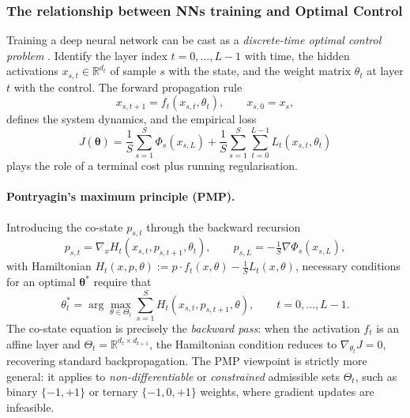\documentclass{article}
\begin{document}
\subsubsection{The relationship between NNs training and Optimal Control}

Training a deep neural network can be cast as a \emph{discrete-time optimal
control problem} \cite{li2018oc}.  Identify the layer index $t=0,\ldots,L-1$
with time, the hidden activations $x_{s,t}\in\mathbb{R}^{d_t}$ of sample $s$
with the state, and the weight matrix $\theta_t$ at layer $t$ with the control.
The forward propagation rule
\begin{equation}
    x_{s,t+1} = f_t(x_{s,t},\theta_t),\qquad x_{s,0}=x_{s},
\end{equation}
defines the system dynamics, and the empirical loss
\begin{equation}
    J(\boldsymbol\theta)
    = \frac{1}{S}\sum_{s=1}^{S}\Phi_s(x_{s,L})
    + \frac{1}{S}\sum_{s=1}^{S}\sum_{t=0}^{L-1}L_t(x_{s,t},\theta_t)
\end{equation}
plays the role of a terminal cost plus running regularisation.

\paragraph{Pontryagin's maximum principle (PMP).}
Introducing the co-state $p_{s,t}$ through the backward recursion
\begin{equation}
    p_{s,t} = \nabla_{x}H_t(x_{s,t},p_{s,t+1},\theta_t),\qquad
    p_{s,L} = -\tfrac{1}{S}\nabla\Phi_s(x_{s,L}),
\end{equation}
with Hamiltonian $H_t(x,p,\theta):=p\cdot f_t(x,\theta)-\tfrac{1}{S}L_t(x,\theta)$,
necessary conditions for an optimal $\boldsymbol\theta^*$ require that
\begin{equation}
    \theta_t^* = \arg\max_{\theta\in\Theta_t}\sum_{s=1}^{S}
                 H_t(x_{s,t},p_{s,t+1},\theta),
                 \qquad t=0,\ldots,L-1.
\end{equation}
The co-state equation is precisely the \emph{backward pass}: when the
activation $f_t$ is an affine layer and $\Theta_t=\mathbb{R}^{d_t\times
d_{t+1}}$, the Hamiltonian condition reduces to $\nabla_{\theta_t}J=0$,
recovering standard backpropagation.  The PMP viewpoint is strictly more
general: it applies to \emph{non-differentiable} or \emph{constrained}
admissible sets $\Theta_t$, such as binary $\{-1,+1\}$ or ternary
$\{-1,0,+1\}$ weights, where gradient updates are infeasible.
\end{document}
